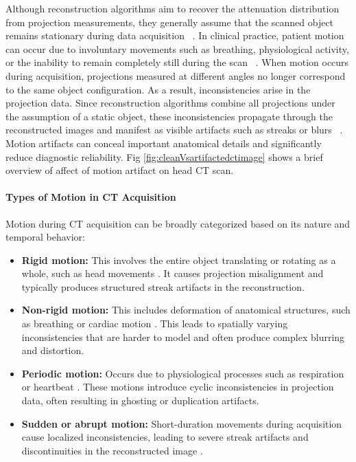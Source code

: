 Although reconstruction algorithms aim to recover the attenuation distribution from projection measurements, they generally assume that the scanned object remains stationary during data acquisition ~\cite{common_ct_artifacts}.  In clinical practice, patient motion can occur due to involuntary movements such as breathing, physiological activity, or the inability to remain completely still during the scan ~\cite{boas_ct_artifacts}. When motion occurs during acquisition, projections measured at different angles no longer correspond to the same object configuration. As a result, inconsistencies arise in the projection data. Since reconstruction algorithms combine all projections under the assumption of a static object, these inconsistencies propagate through the reconstructed images and manifest as visible artifacts such as streaks or blurs  ~\cite{common_ct_artifacts}.  Motion artifacts can conceal important anatomical details and significantly reduce diagnostic reliability. 
Fig \ref{fig:cleanVsartifactedctimage} shows a brief overview of affect of motion artifact on head CT scan. 

\paragraph{Types of Motion in CT Acquisition}

Motion during CT acquisition can be broadly categorized based on its nature and temporal behavior:

\begin{itemize}

\item \textbf{Rigid motion:}  
This involves the entire object translating or rotating as a whole, such as head movements \cite{ko2021rigid}. It causes projection misalignment and typically produces structured streak artifacts in the reconstruction.


\item \textbf{Non-rigid motion:}  
This includes deformation of anatomical structures, such as breathing or cardiac motion \cite{ko2021rigid}. This leads to spatially varying inconsistencies that are harder to model and often produce complex blurring and distortion.

\item \textbf{Periodic motion:}  
Occurs due to physiological processes such as respiration or heartbeat \cite{common_ct_artifacts}. These motions introduce cyclic inconsistencies in projection data, often resulting in ghosting or duplication artifacts.

\item \textbf{Sudden or abrupt motion:}  
Short-duration movements during acquisition cause localized inconsistencies, leading to severe streak artifacts and discontinuities in the reconstructed image \cite{common_ct_artifacts}.

\end{itemize}




